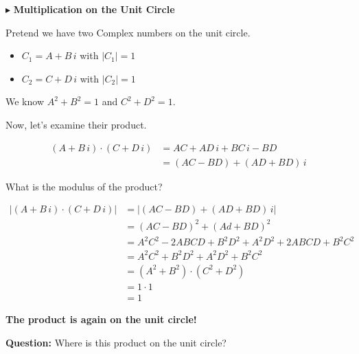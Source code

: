 \documentclass{ximera}
\begin{document}
$\blacktriangleright$ \textbf{\textcolor{blue!75!black}{Multiplication on the Unit Circle}}  


Pretend we have two Complex numbers on the unit circle.

\begin{itemize}
\item $C_1 = A + B \, i$ with $|C_1| = 1$
\item $C_2 = C + D \, i$ with $|C_2| = 1$
\end{itemize}



We know $A^2 + B^2 = 1$  and $C^2 + D^2 = 1$.



Now, let's examine their product.






\begin{align*}
(A + B \, i) \cdot (C + D \, i)      & = AC + AD \, i + BC \, i - BD   \\
                & = (AC - BD) + (AD + BD) \, i
\end{align*}



What is the modulus of the product?





\begin{align*}
|(A + B \, i) \cdot (C + D \, i)|      & = | (AC - BD) + (AD + BD) \, i | \\
                & = (AC - BD)^2 + (Ad + BD)^2   \\
                & = A^2C^2 - 2ABCD + B^2D^2 + A^2D^2 + 2ABCD + B^2C^2  \\
                & = A^2C^2 + B^2D^2 + A^2D^2 + B^2C^2  \\
                & = (A^2 + B^2) \cdot (C^2 + D^2)   \\
                & = 1 \cdot 1  \\
                & = 1
\end{align*}



\textbf{\textcolor{purple!85!blue}{The product is again on the unit circle!}}





\textbf{Question:} Where is this product on the unit circle?
\end{document}
